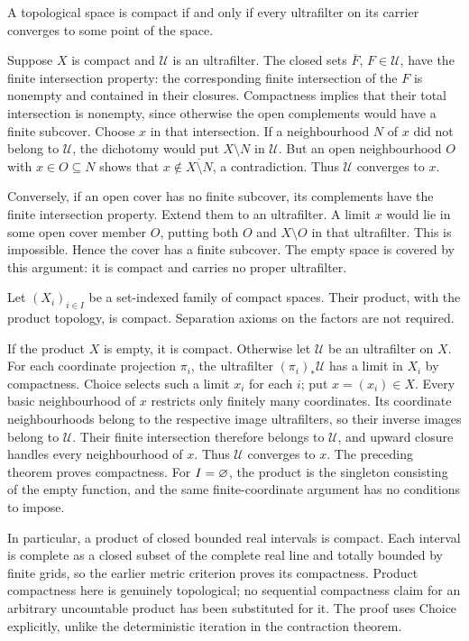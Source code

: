 \begin{theorem}
\label{thm:compact_ultrafilter}
A topological space is compact if and only if every ultrafilter on its
carrier converges to some point of the space.
\end{theorem}
\Proof
Suppose $X$ is compact and $\mathcal U$ is an ultrafilter. The closed
sets $\overline F$, $F\in\mathcal U$, have the finite intersection
property: the corresponding finite intersection of the $F$ is nonempty
and contained in their closures. Compactness implies that their total
intersection is nonempty, since otherwise the open complements would
have a finite subcover. Choose $x$ in that intersection. If a neighbourhood
$N$ of $x$ did not belong to $\mathcal U$, the dichotomy would put
$X\setminus N$ in $\mathcal U$. But an open neighbourhood $O$ with
$x\in O\subseteq N$ shows that
$x\notin\overline{X\setminus N}$, a contradiction. Thus
$\mathcal U$ converges to $x$.

Conversely, if an open cover has no finite subcover, its complements
have the finite intersection property. Extend them to an ultrafilter.
A limit $x$ would lie in some open cover member $O$, putting both $O$
and $X\setminus O$ in that ultrafilter. This is impossible. Hence the
cover has a finite subcover. The empty space is covered by this argument:
it is compact and carries no proper ultrafilter.
\Done

\begin{theorem}
\label{thm:tychonoff}
Let $(X_i)_{i\in I}$ be a set-indexed family of compact spaces. Their
product, with the product topology, is compact. Separation axioms on the
factors are not required.
\end{theorem}
\Proof
If the product $X$ is empty, it is compact. Otherwise let $\mathcal U$
be an ultrafilter on $X$. For each coordinate projection $\pi_i$, the
ultrafilter $(\pi_i)_*\mathcal U$ has a limit in $X_i$ by compactness.
Choice selects such a limit $x_i$ for each $i$; put $x=(x_i)\in X$.
Every basic neighbourhood of $x$ restricts only finitely many coordinates.
Its coordinate neighbourhoods belong to the respective image ultrafilters,
so their inverse images belong to $\mathcal U$. Their finite intersection
therefore belongs to $\mathcal U$, and upward closure handles every
neighbourhood of $x$. Thus $\mathcal U$ converges to $x$. The preceding
theorem proves compactness. For $I=\varnothing$, the product is the
singleton consisting of the empty function, and the same finite-coordinate
argument has no conditions to impose.
\Done

In particular, a product of closed bounded real intervals is compact.
Each interval is complete as a closed subset of the complete real line
and totally bounded by finite grids, so the earlier metric criterion
proves its compactness. Product compactness here is genuinely topological;
no sequential compactness claim for an arbitrary uncountable product has
been substituted for it. The proof uses Choice explicitly, unlike the
deterministic iteration in the contraction theorem.



